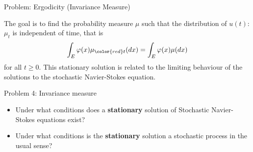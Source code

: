 \documentclass[xcolor=dvipsnames,leqno]{beamer}
\begin{document}
\begin{frame}{Problem: Ergodicity (Invariance Measure)}

 The goal is to find the probability measure $\mu$ such that the distribution of $u(t)$: $\mu_t$ is independent of time, that is
\begin{align*}
	\int_{E}\varphi(x)\mu_{{\color{red}t}}(dx)=\int_{E}\varphi(x)\mu(dx)
\end{align*}
		for all $t\geq 0$. This stationary solution is related to the limiting behaviour of the solutions to the stochastic Navier-Stokes equation.
\begin{block}{Problem 4: Invariance measure}    
	\begin{itemize}   		
		\item Under what conditions does a \textbf{stationary}  solution of Stochastic Navier-Stokes equations exist?
		\item Under what conditions is the \textbf{stationary} solution a stochastic process in the usual sense?
	\end{itemize}   
\end{block}
\end{frame}
              
\end{document}
